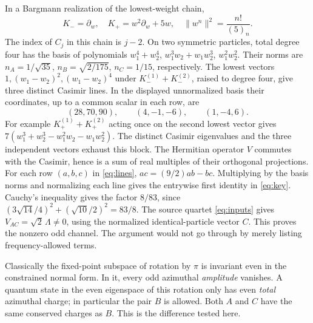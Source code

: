 \documentclass[11pt]{article}
\numberwithin{equation}{section}
\begin{document}
In a Bargmann realization of the lowest-weight chain,
\[
 K_-=\partial_w,\quad K_+=w^2\partial_w+5w,\quad
 \|w^n\|^2=\frac{n!}{(5)_n}.
\]
The index of \(C_j\) in this chain is \(j-2\).
On two symmetric particles, total degree four has the
basis of polynomials \(w_1^4+w_2^4\),
\(w_1^3w_2+w_1w_2^3\), \(w_1^2w_2^2\).
Their norms are \(n_A=1/\sqrt{35}\),
\(n_B=\sqrt{2/175}\), \(n_C=1/15\), respectively.
The lowest vectors \(1,(w_1-w_2)^2,(w_1-w_2)^4\)
under \(K_-^{(1)}+K_-^{(2)}\), raised to degree four,
give three distinct Casimir lines.
In the displayed unnormalized basis their coordinates, up
to a common scalar in each row, are
\begin{equation}\label{eq:lines}
 (28,70,90),\qquad (4,-1,-6),\qquad (1,-4,6).
\end{equation}
For example \(K_+^{(1)}+K_+^{(2)}\) acting once on the
second lowest vector gives \(7(w_1^3+w_2^3-w_1^2w_2-w_1w_2^2)\).
The distinct Casimir eigenvalues and the three independent
vectors exhaust this block. The Hermitian operator \(V\)
commutes with the Casimir, hence is a sum of real multiples
of their orthogonal projections. For each row \((a,b,c)\) in
\eqref{eq:lines}, \(ac=(9/2)ab-bc\).
Multiplying by the basis norms and normalizing each line
gives the entrywise first identity in \eqref{eq:key}.
Cauchy's inequality gives the factor \(8/83\), since
\((3\sqrt{14}/4)^2+(\sqrt{10}/2)^2=83/8\).
The source quartet \eqref{eq:inputs} gives
\(V_{AC}=\sqrt2\,\Lambda\ne0\), using the normalized
identical-particle vector \(C\). This proves the nonzero
odd channel. The argument would not go through by merely
listing frequency-allowed terms.

Classically the fixed-point subspace of rotation by \(\pi\)
is invariant even in the constrained normal form. In it,
every odd azimuthal \emph{amplitude} vanishes. A quantum state
in the even eigenspace of this rotation only has even
\emph{total} azimuthal charge; in particular the pair \(B\)
is allowed. Both \(A\) and \(C\) have the same conserved
charges as \(B\). This is the difference tested here.
\end{document}
